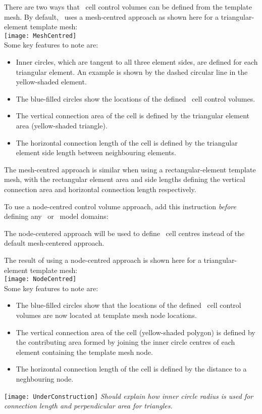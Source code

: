 There are two ways that \mf\ cell control volumes can be defined from the template mesh.  By default, \mut\ uses a mesh-centred approach as shown here for a triangular-element template mesh:
    \vspace{.2in} \\
    \texttt{[image: MeshCentred]}
    \vspace{.2in} \\
Some key features to note are:
\begin{itemize}
    \item Inner circles, which are tangent to all three element sides, are defined for each triangular element.  An example is shown by the dashed circular line in the yellow-shaded element.
    \item The blue-filled circles show the locations of the defined \mf\ cell control volumes.
    \item The vertical connection area of the cell is defined by the triangular element area (yellow-shaded triangle).
    \item The horizontal connection length of the cell is defined by the triangular element side length between neighbouring elements.
\end{itemize}

The mesh-centred approach is similar when using a  rectangular-element template mesh, with the rectangular element area and side lengths defining the vertical connection area and horizontal connection length respectively.

To use a node-centred control volume approach, add this instruction {\em before} defining any \gwf\ or \swf\ model domains:

    {The node-centered approach will be used to define \mf\ cell centres instead of the default mesh-centered approach.
     }

The result of using a node-centred approach is shown here for a triangular-element template mesh:
    \vspace{.2in} \\
    \texttt{[image: NodeCentred]}
    \vspace{.2in} \\
Some key features to note are:
\begin{itemize}
    \item The blue-filled circles show that the locations of the defined \mf\ cell control volumes are now located at template mesh node locations.
    \item The vertical connection area of the cell (yellow-shaded polygon) is defined by the contributing area formed by joining the inner circle centres of each element containing the template mesh node.
    \item The horizontal connection length of the cell is defined by the distance to a neghbouring node.
\end{itemize}


\texttt{[image: UnderConstruction]} \textit{Should explain how inner circle radius is used for connection length and perpendicular area for triangles.}



